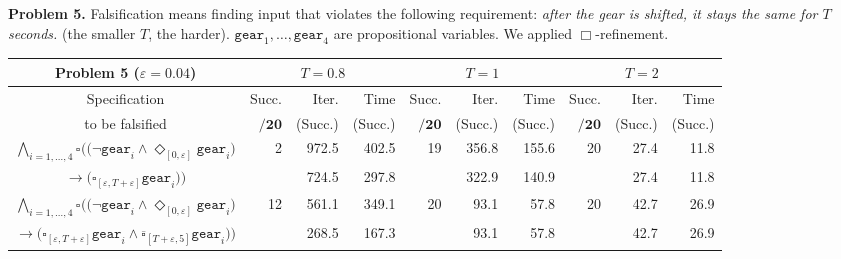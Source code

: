 \documentclass[envcountsect,orivec]{llncs} \usepackage{etex} \usepackage[]{graphicx}
\newcommand{\DiaOp}[1]{\Diamond_{#1}}
\newcommand{\BoxOp}[1]{\square_{#1}}
\newcommand{\TBoxOp}[1]{\overline{\square}_{#1}}
\newcommand{\Succ}{Succ.}
\begin{document}
\begin{table}[ptb]
  \vspace{1em}
  \begin{minipage}{\textwidth}
    \textbf{Problem 5.} Falsification means finding input
    that violates the following requirement: \emph{after the gear is
      shifted, it stays the same for $T$ seconds.}
(the smaller $T$, the harder).
    $\mathtt{gear}_{1},\dotsc,\mathtt{gear}_{4}$ are propositional variables.
    We applied $\Box$-refinement.
  \end{minipage}
  \begin{tabular}{c||r|r|r|r|r|r|r|r|r}
    \textbf{Problem 5} ($\varepsilon = 0.04$)
    &\multicolumn{3}{|c|}{$T = 0.8$} &\multicolumn{3}{|c|}{$T = 1$} &\multicolumn{3}{|c}{$T = 2$}\\ \hline
    Specification & \Succ & Iter. & Time & \Succ & Iter. & Time &
    \Succ & Iter. & Time \\
    to be falsified
    & $\mathbf{/20}$ & (\Succ) & (\Succ) & $\mathbf{/20}$& (\Succ) & (\Succ)& $\mathbf{/20}$ & (\Succ) & (\Succ)\\  \hline\hline
    {\scriptsize $\bigwedge_{i=1,\dotsc,4}\BoxOp{}\Big(\big( \neg \mathtt{gear}_i \wedge \DiaOp{[0,\varepsilon]}\mathtt{gear}_i \big)$}
    & 2& 972.5 & 402.5& 19& 356.8& 155.6& 20& 27.4& 11.8\\
    {\scriptsize $\to \big(\BoxOp{[\varepsilon, T+\varepsilon]} \mathtt{gear}_i \big) \Big)$}
    &  & 724.5 & 297.8&   & 322.9& 140.9&   & 27.4& 11.8\\ \hline
    {\scriptsize $\bigwedge_{i=1,\dotsc,4}\BoxOp{}\Big(\big(\neg \mathtt{gear}_i \wedge \DiaOp{[0,\varepsilon]}\mathtt{gear}_i \big)$}
    & 12& 561.1& 349.1& 20& 93.1& 57.8& 20& 42.7& 26.9\\
    {\scriptsize $\to \big(\BoxOp{[\varepsilon, T+\varepsilon]} \mathtt{gear}_i\wedge \TBoxOp{[T+\varepsilon, 5]} \mathtt{gear}_i\big)\Big)$}
    &   & 268.5& 167.3&   & 93.1& 57.8&   & 42.7& 26.9\\
  \end{tabular}


\end{table}
\end{document}
